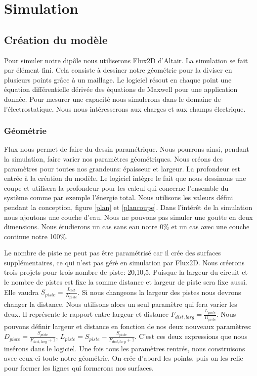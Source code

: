 \graphicspath{ {./figuresSimulation} }
\section{Simulation}
\subsection{Création du modèle}
Pour simuler notre dipôle nous utiliserons Flux2D d'Altair. La simulation se fait par élément fini. Cela consiste à dessiner notre géométrie pour la diviser en plusieurs points grâce à un maillage. Le logiciel résout en chaque point une équation différentielle dérivée des équations de Maxwell pour une application donnée. Pour mesurer une capacité nous simulerons dans le domaine de l'électrostatique. Nous nous intéresserons aux charges et aux champs électrique.

\subsubsection{Géométrie}
Flux nous permet de faire du dessin paramétrique. Nous pourrons ainsi, pendant la simulation, faire varier nos paramètres géométriques. Nous créons des paramètres pour toutes nos grandeurs: épaisseur et largeur. La profondeur est entrée à la création du modèle. Le logiciel intègre le fait que nous dessinons une coupe et utilisera la profondeur  pour les calcul qui concerne l'ensemble du système comme par exemple l'énergie total. Nous utilisons les valeurs défini pendant la conception, figure \ref{plan} et \ref{plancoupe}. Dans l’intérêt de la simulation nous ajoutons une couche d'eau. Nous ne pouvons pas simuler une goutte en deux dimensions. Nous étudierons un cas sans eau notre 0\% et un cas avec une couche continue notre 100\%. 

Le nombre de piste ne peut pas être paramétrisé car il crée des surfaces supplémentaires, ce qui n'est pas géré en simulation par Flux2D. Nous créerons trois projets pour trois nombre de piste: 20,10,5. Puisque la largeur du circuit et le nombre de pistes est fixe la somme distance et largeur de piste sera fixe aussi. Elle vaudra $S_{piste} = \frac{L_{pcb}}{N_{piste}}$. Si nous changeons la largeur des pistes nous devrons changer la distance. Nous utilisons alors un seul paramètre qui fera varier les deux. Il représente le rapport entre largeur et distance $F_{dist,larg} = \frac{L_{piste}}{D_{piste}} $. Nous pouvons définir largeur et distance en fonction de nos deux nouveaux paramètres: $D_{piste} = \frac{S_{piste}}{F_{dist,larg}+1}$, $L_{piste} = S_{piste} - \frac{S_{piste}}{F_{dist,larg}+1}$. C'est ces deux expressions que nous insérons dans le logiciel. 
Une fois tous les paramètres rentrés, nous construisons avec ceux-ci toute notre géométrie. On crée d'abord les points, puis on les relie pour former les lignes qui formerons nos surfaces. 

